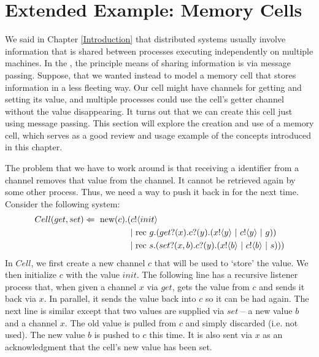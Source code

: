 \section{Extended Example: Memory Cells}
	We said in Chapter \ref{Introduction} that distributed systems usually involve information that is shared between processes executing independently on multiple machines.  
In the \picalc, the principle means of sharing information is via message passing.  
Suppose, that we wanted instead to model a memory cell that stores information in a less fleeting way.  
Our cell might have channels for getting and setting its value, and multiple processes could use the cell's getter channel without the value disappearing.  
It turns out that we can create this cell just using message passing.  
This section will explore the creation and use of a memory cell, which serves as a good review and usage example of the concepts introduced in this chapter.

	The problem that we have to work around is that receiving a identifier from a channel removes that value from the channel.  
It cannot be retrieved again by some other process.  
Thus, we need a way to push it back in for the next time.  
Consider the following system:
	\begin{equation}\begin{split}
		Cell(get,set) \Leftarrow\  \text{new}({c}). & ({c}!\langle{init}\rangle \\
		& \ |\ \text{rec }{g}.({get}?({x}).{c}?({y}).({x}!\langle{y}\rangle\ |\  {c}!\langle{y}\rangle\ |\  g))\\
		&\ |\ \text{rec }{s}.({set}?({x,b}).{c}?({y}).({x}!\langle{b}\rangle\ |\ {c}!\langle{b}\rangle\ |\  s)))
	\end{split}\end{equation}
	In $Cell$, we first create a new channel $c$ that will be used to `store' the value.  
We then initialize $c$ with the value $init$.  
The following line has a recursive listener process that, when given a channel $x$ via $get$, gets the value from $c$ and sends it back via $x$.  
In parallel, it sends the value back into $c$ so it can be had again.  
The next line is similar except that two values are supplied via $set$ -- a new value $b$ and a channel $x$.  
The old value is pulled from $c$ and simply discarded (i.e. not used).  
The new value $b$ is pushed to $c$ this time.  
It is also sent via $x$ as an acknowledgment that the cell's new value has been set.
	 
